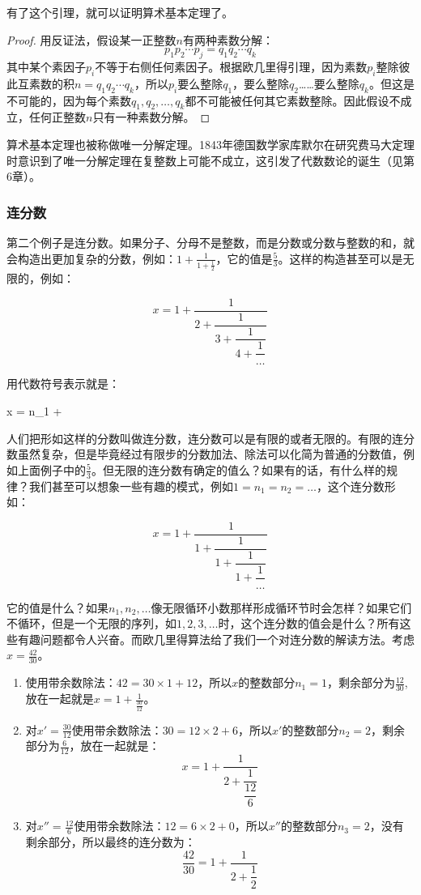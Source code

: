 \documentclass[b5paper]{ctexart}
\begin{document}
有了这个引理，就可以证明算术基本定理了。

\begin{proof}
用反证法，假设某一正整数$n$有两种素数分解：
\[
p_1 p_2 \dotsm p_j = q_1 q_2 \dotsm q_k
\]
其中某个素因子$p_i$不等于右侧任何素因子。根据欧几里得引理，因为素数$p_i$整除彼此互素数的积$n = q_1 q_2 \dotsm q_k$，所以$p_i$要么整除$q_1$，要么整除$q_2$……要么整除$q_k$。但这是不可能的，因为每个素数$q_1, q_2, \dotsc, q_k$都不可能被任何其它素数整除。因此假设不成立，任何正整数$n$只有一种素数分解。
\end{proof}

算术基本定理也被称做唯一分解定理。1843年德国数学家库默尔在研究费马大定理时意识到了唯一分解定理在复整数上可能不成立，这引发了代数数论的诞生（见第6章）。

\subsubsection{连分数}
第二个例子是连分数。如果分子、分母不是整数，而是分数或分数与整数的和，就会构造出更加复杂的分数，例如：$1 + \frac{1}{1 + \frac{1}{2}}$，它的值是$\frac{5}{3}$。这样的构造甚至可以是无限的，例如：

\[
x = 1 + \dfrac{1}{2 + \dfrac{1}{3 + \dfrac{1}{4 + \dfrac{1}{\dotso}}}}
\]

用代数符号表示就是：

\be
x = n_1 + 
\ee

人们把形如这样的分数叫做连分数，连分数可以是有限的或者无限的。有限的连分数虽然复杂，但是毕竟经过有限步的分数加法、除法可以化简为普通的分数值，例如上面例子中的$\frac{5}{3}$。但无限的连分数有确定的值么？如果有的话，有什么样的规律？我们甚至可以想象一些有趣的模式，例如$1 = n_1 = n_2 = \dotso $，这个连分数形如：

\[
x = 1 + \dfrac{1}{1 + \dfrac{1}{1 + \dfrac{1}{1 + \dfrac{1}{\dotso}}}}
\]

它的值是什么？如果$n_1, n_2, \dotsc$像无限循环小数那样形成循环节时会怎样？如果它们不循环，但是一个无限的序列，如$1, 2, 3, \dotso$时，这个连分数的值会是什么？所有这些有趣问题都令人兴奋。而欧几里得算法给了我们一个对连分数的解读方法。考虑$x = \frac{42}{30}$。

\begin{enumerate}[第1步，]
\item 使用带余数除法：$42 = 30 \times 1 + 12$，所以$x$的整数部分$n_1 = 1$，剩余部分为$\frac{12}{30}$, 放在一起就是$x = 1 + \frac{1}{\frac{30}{12}}$。
\item 对$x' = \frac{30}{12}$使用带余数除法：$30 = 12 \times 2 + 6$，所以$x'$的整数部分$n_2 = 2$，剩余部分为$\frac{6}{12}$，放在一起就是：
\[
x = 1 + \dfrac{1}{2 + \dfrac{1}{\dfrac{12}{6}}}
\]
\item 对$x'' = \frac{12}{6}$使用带余数除法：$12 = 6 \times 2 + 0$，所以$x''$的整数部分$n_3 = 2$，没有剩余部分，所以最终的连分数为：
\[
\dfrac{42}{30} = 1 + \dfrac{1}{2 + \dfrac{1}{2}}
\]
\end{enumerate}
\end{document}
